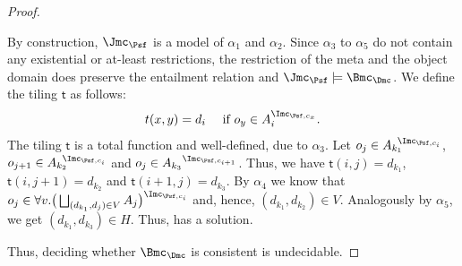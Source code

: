 \begin{proof}
\begin{claimproof}
    By construction, $\J_{\Psf}$ is a model of $\alpha_{1}$ and $\alpha_{2}$. Since $\alpha_{3}$ to
    $\alpha_{5}$ do not contain any existential or at-least restrictions, the restriction of the
    meta and the object domain does preserve the entailment relation and
    $\J_{\Psf}\models\Bmc_{\Dmc}$. We define the tiling $\mathsf{t}$ as follows:
    \begin{align*}
      t(x,y) = d_{i} \quad\text{ if $o_{y} \in A_{i}^{\I_{\Psf,c_{x}}}$}.
    \end{align*}
    The tiling $\mathsf{t}$ is a total function and well-defined, due to $\alpha_{3}$. Let
    $o_{j} \in {A_{k_{1}}}^{\!\!\!\I_{\Psf,c_{i}}}$,
    $o_{j+1} \in {A_{k_{2}}}^{\!\!\!\I_{\Psf,c_{i}}}$ and
    $o_{j} \in {A_{k_{3}}}^{\I_{\Psf,c_{i+1}}}$. Thus, we have $\mathsf{t}(i,j) = d_{k_{1}}$,
    $\mathsf{t}(i,j+1) = d_{k_{2}}$ and $\mathsf{t}(i+1,j) = d_{k_{3}}$. By $\alpha_{4}$ we know
    that
    $o_{j} \in \smash{\forall v.\big(\bigsqcup_{(d_{k_{1}},d_{j})\in V}
      A_{j}\big)^{\I_{\Psf,c_{i}}}}$ and, hence, $(d_{k_{1}}, d_{k_{2}})\in V$. Analogously by
    $\alpha_{5}$, we get $(d_{k_{1}}, d_{k_{3}})\in H$. Thus, \Dmc has a solution.
  \end{claimproof}

  Thus, deciding whether $\Bmc_{\Dmc}$ is consistent is undecidable.
\end{proof}


